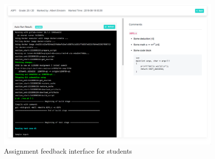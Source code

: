 \begin{figure}[H]
    \centering
        \includegraphics[width=1.0\textwidth]{figures/feedback}
    \caption{Assignment feedback interface for students}
    \label{fig:FEEDBACK}
\end{figure}